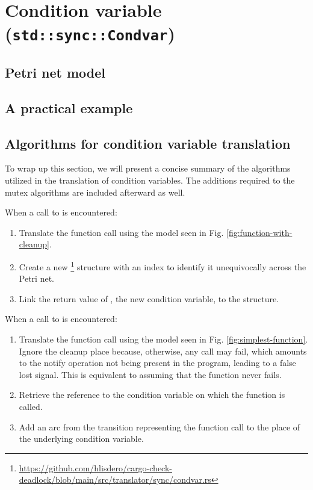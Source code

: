 \section{Condition variable (\texttt{std::sync::Condvar})}

\subsection{Petri net model}

\subsection{A practical example}

\subsection{Algorithms for condition variable translation}
\label{sec:condvar-algorithms}

To wrap up this section, we will present a concise summary
of the algorithms utilized in the translation of condition variables.
The additions required to the mutex algorithms are included afterward as well.

When a call to  is encountered:

\begin{enumerate}
  \item Translate the function call using the model seen in Fig. \ref{fig:function-with-cleanup}.
  \item Create a new \footnote{\url{https://github.com/hlisdero/cargo-check-deadlock/blob/main/src/translator/sync/condvar.rs}}
        structure with an index to identify it unequivocally across the Petri net.
  \item Link the return value of ,
        the new condition variable, to the  structure.
\end{enumerate}

When a call to  is encountered:

\begin{enumerate}
  \item Translate the function call using the model seen in Fig. \ref{fig:simplest-function}.
        Ignore the cleanup place because, otherwise, any call may fail,
        which amounts to the notify operation not being present in the program,
        leading to a false lost signal.
        This is equivalent to assuming that the  function never fails.
  \item Retrieve the  reference to the condition variable
        on which the function is called.
  \item Add an arc from the transition representing the function call
        to the  place of the underlying condition variable.
\end{enumerate}

